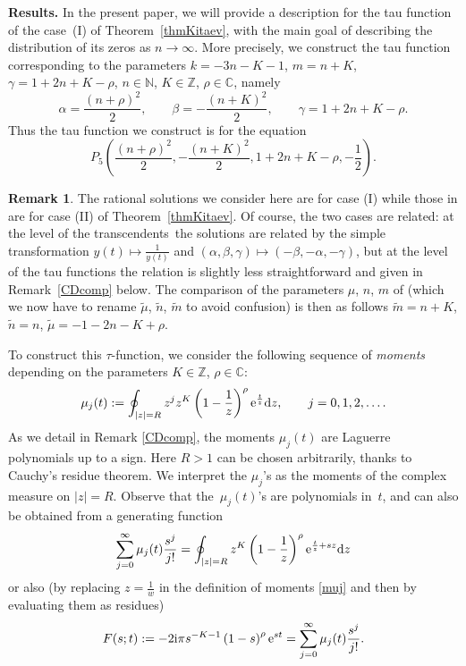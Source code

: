 \documentclass[10pt,a4paper]{amsart}
\numberwithin{equation}{section}
\theoremstyle{definition}
\newtheorem{Remark}[Theorem]{Remark}
\def\le{\left}
\def\ri{\right}
\def \wt{ \widetilde }
\def \d{{\mathrm d}}
\def\be{\begin{equation}}
\def\ee{\end{equation}}
\def\C{{\mathbb C}}
\def\Z{{\mathbb Z}}
\def\N{{\mathbb N}}
\begin{document}
{\bf Results.}
In the present paper, we will provide a description for the tau function of the case~(I) of Theorem~\ref{thmKitaev}, with the main goal of describing the distribution of its zeros as $n\to \infty$.
More precisely, we construct the tau function corresponding to the parameters
$k = -3n - {K} -1$, $ m = n+ {K}$, $ \gamma = 1+2n + {K} -{\rho}$, $ n\in \N$, $ {K} \in \Z$, $ {\rho} \in \C$,
namely
\[%
\alpha = \frac {(n+ { {\rho}})^2}2,\qquad
\beta = -\frac {(n + { {K}})^2} 2,\qquad
\gamma = 1+2n + { {K}} - { {\rho}}.
\]
Thus the tau function we construct is for the equation
\[
P_5\le( \frac {(n+ { {\rho}})^2}2, -\frac {(n + { {K}})^2} 2, 1+2n + { {K}} - { {\rho}}, - \frac 1 2\ri).
\]
\begin{Remark}
The rational solutions we consider here are for case (I) while those in \cite{ClarksonDunning} are for case (II) of Theorem~\ref{thmKitaev}. Of course, the two cases are related: at the level of the transcendents~the solutions are related by the simple transformation $y(t)\mapsto \frac 1{y(t)}$ and $(\alpha,\beta, \gamma)\mapsto (-\beta,-\alpha,-\gamma)$, but at the level of the tau functions the relation is slightly less straightforward and given in Remark~\ref{CDcomp} below.
The comparison of the parameters $\mu$, $n$, $m$ of \cite{ClarksonDunning} (which we now have to rename $\wt \mu$, $\wt n$, $\wt m$ to avoid confusion) is then as follows
$
\wt m= n+ { {K}} $, $ \wt n= n$, $
\wt \mu =- 1-2n- { {K}}+ { {\rho}}$.
\end{Remark}
To construct this $\tau$-function, we consider the following sequence of {\it moments} depending on the parameters ${K} \in \Z$, ${\rho} \in \C$:
\be
\label{muj}
\mu_j(t):= \oint_{|z|=R}z^j z^{ {K}} \le(1 - \frac 1 z \ri)^{{\rho}} {\rm e}^{\frac t z}\d z, \qquad j=0,1,2,\dots.
\ee
As we detail in Remark \ref{CDcomp}, the moments $\mu_j(t)$ are Laguerre polynomials up to a sign.
Here $R>1$ can be chosen arbitrarily, thanks to Cauchy's residue theorem.
We interpret the $\mu_j$'s as the moments of the complex measure \smash{$\d\mu(z) = z^{ {K}} \le(1 - \frac 1 z \ri)^{{\rho}} {\rm e}^{\frac t z}\d z$} on $|z|=R$. Observe that the~$\mu_j(t)$'s are polynomials in~$t$, and can also be obtained from a generating function
\[
\sum_{j=0}^\infty \mu_j(t) \frac{s^j}{j!} = \oint_{|z|=R} z^{ {K}} \le(1 - \frac 1 z \ri)^{{\rho}} {\rm e}^{\frac t z + sz}\d z
\]
 or also (by replacing $z= \frac 1 w$ in the definition of moments \eqref{muj} and then by evaluating them as residues)
 \[
 F(s;t):=-2{\rm i}\pi s^{-{K}-1} \le(1-s\ri)^{{\rho}} {\rm e}^{st} = \sum_{j=0}^{\infty} \mu_j(t) \frac { s^j}{j!}.
 \]
\end{document}
